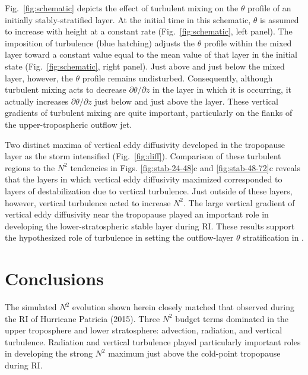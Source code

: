 \documentclass{ametsoc}
\begin{document}
Fig.~\ref{fig:schematic} depicts the effect of turbulent mixing on the $\theta$ profile of an initially stably-stratified layer.
At the initial time in this schematic, $\theta$ is assumed to increase with height at a constant rate (Fig.~\ref{fig:schematic}, left panel).
The imposition of turbulence (blue hatching) adjusts the $\theta$ profile within the mixed layer toward a constant value equal to the mean value of that layer in the initial state (Fig.~\ref{fig:schematic}, right panel).
Just above and just below the mixed layer, however, the $\theta$ profile remains undisturbed.
Consequently, although turbulent mixing acts to decrease $\partial \theta/\partial z$ in the layer in which it is occurring, it actually increases $\partial \theta/\partial z$ just below and just above the layer.
These vertical gradients of turbulent mixing are quite important, particularly on the flanks of the upper-tropospheric outflow jet.

Two distinct maxima of vertical eddy diffusivity developed in the tropopause layer as the storm intensified (Fig.~\ref{fig:diff}).
Comparison of these turbulent regions to the $N^2$ tendencies in Figs. \ref{fig:stab-24-48}c and \ref{fig:stab-48-72}c reveals that the layers in which vertical eddy diffusivity maximized corresponded to layers of destabilization due to vertical turbulence.
Just outside of these layers, however, vertical turbulence acted to increase $N^2$.
The large vertical gradient of vertical eddy diffusivity near the tropopause played an important role in developing the lower-stratospheric stable layer during RI.
These results support the hypothesized role of turbulence in setting the outflow-layer $\theta$ stratification in \cite{RotunnoEmanuel}.

  \section{Conclusions}

The simulated $N^2$ evolution shown herein closely matched that observed during the RI of Hurricane Patricia (2015).
Three $N^2$ budget terms dominated in the upper troposphere and lower stratosphere: advection, radiation, and vertical turbulence.
Radiation and vertical turbulence played particularly important roles in developing the strong $N^2$ maximum just above the cold-point tropopause during RI.
\end{document}
